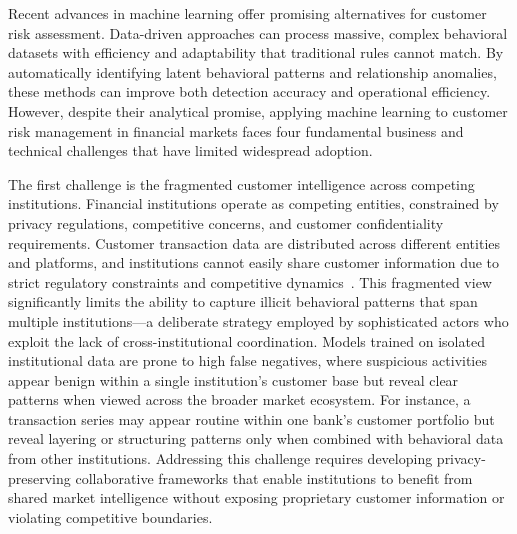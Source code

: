 Recent advances in machine learning offer promising alternatives for customer risk assessment. Data-driven approaches can process massive, complex behavioral datasets with efficiency and adaptability that traditional rules cannot match. By automatically identifying latent behavioral patterns and relationship anomalies, these methods can improve both detection accuracy and operational efficiency. However, despite their analytical promise, applying machine learning to customer risk management in financial markets faces four fundamental business and technical challenges that have limited widespread adoption. 

The first challenge is the fragmented customer intelligence across competing institutions. Financial institutions operate as competing entities, constrained by privacy regulations, competitive concerns, and customer confidentiality requirements. Customer transaction data are distributed across different entities and platforms, and institutions cannot easily share customer information due to strict regulatory constraints and competitive dynamics~\parencite{amoako2025exploring}. This fragmented view significantly limits the ability to capture illicit behavioral patterns that span multiple institutions—a deliberate strategy employed by sophisticated actors who exploit the lack of cross-institutional coordination. Models trained on isolated institutional data are prone to high false negatives, where suspicious activities appear benign within a single institution's customer base but reveal clear patterns when viewed across the broader market ecosystem. For instance, a transaction series may appear routine within one bank's customer portfolio but reveal layering or structuring patterns only when combined with behavioral data from other institutions. Addressing this challenge requires developing privacy-preserving collaborative frameworks that enable institutions to benefit from shared market intelligence without exposing proprietary customer information or violating competitive boundaries. 


